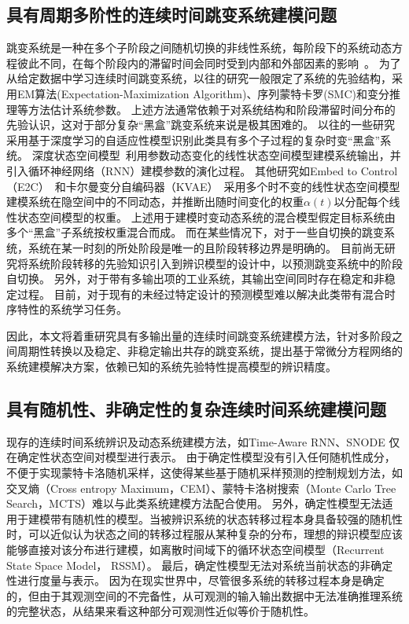 \subsection{具有周期多阶性的连续时间跳变系统建模问题}
跳变系统是一种在多个子阶段之间随机切换的非线性系统，每阶段下的系统动态方程彼此不同，在每个阶段内的滞留时间会同时受到内部和外部因素的影响~\cite{WANG2022111790}。
为了从给定数据中学习连续时间跳变系统，以往的研究一般限定了系统的先验结构，采用EM算法(Expectation-Maximization Algorithm)\cite{balenzuela2022parameter}、序列蒙特卡罗(SMC)\cite{6859280}和变分推理\cite{opper2007variational}等方法估计系统参数。
上述方法通常依赖于对系统结构和阶段滞留时间分布的先验认识，这对于部分复杂“黑盒”跳变系统来说是极其困难的。
以往的一些研究采用基于深度学习的自适应性模型识别此类具有多个子过程的复杂时变“黑盒”系统。
深度状态空间模型~\cite{Deep_state_space_model}利用参数动态变化的线性状态空间模型建模系统输出，并引入循环神经网络（RNN）建模参数的演化过程。
其他研究如Embed to Control（E2C）~\cite{Watter2015}和卡尔曼变分自编码器（KVAE）~\cite{Fraccaro2017}采用多个时不变的线性状态空间模型建模系统在隐空间中的不同动态，并推断出随时间变化的权重$\alpha(t)$以分配每个线性状态空间模型的权重。
上述用于建模时变动态系统的混合模型假定目标系统由多个“黑盒”子系统按权重混合而成。
而在某些情况下，对于一些自切换的跳变系统，系统在某一时刻的所处阶段是唯一的且阶段转移边界是明确的。
目前尚无研究将系统阶段转移的先验知识引入到辨识模型的设计中，以预测跳变系统中的阶段自切换。  
另外，对于带有多输出项的工业系统，其输出空间同时存在稳定和非稳定过程\cite{nason2006stationary}。
目前，对于现有的未经过特定设计的预测模型难以解决此类带有混合时序特性的系统学习任务。

因此，本文将着重研究具有多输出量的连续时间跳变系统建模方法，针对多阶段之间周期性转换以及稳定、非稳定输出共存的跳变系统，提出基于常微分方程网络的系统建模解决方案，依赖已知的系统先验特性提高模型的辨识精度。

\subsection{具有随机性、非确定性的复杂连续时间系统建模问题}
现存的连续时间系统辨识及动态系统建模方法，如Time-Aware RNN\cite{Demeester2019}、SNODE\cite{Quaglino2019} 仅在确定性状态空间对模型进行表示。
由于确定性模型没有引入任何随机性成分，不便于实现蒙特卡洛随机采样，这使得某些基于随机采样预测的控制规划方法，如交叉熵（Cross entropy Maximum，CEM）、蒙特卡洛树搜索（Monte Carlo Tree Search，MCTS）难以与此类系统建模方法配合使用。
另外，确定性模型无法适用于建模带有随机性的模型。当被辨识系统的状态转移过程本身具备较强的随机性时，可以近似认为状态之间的转移过程服从某种复杂的分布，理想的辩识模型应该能够直接对该分布进行建模，如离散时间域下的循环状态空间模型\cite{Hafner2019}（Recurrent State Space Model， RSSM）。
最后，确定性模型无法对系统当前状态的非确定性进行度量与表示。
因为在现实世界中，尽管很多系统的转移过程本身是确定的，但由于其观测空间的不完备性，从可观测的输入输出数据中无法准确推理系统的完整状态，从结果来看这种部分可观测性近似等价于随机性。

